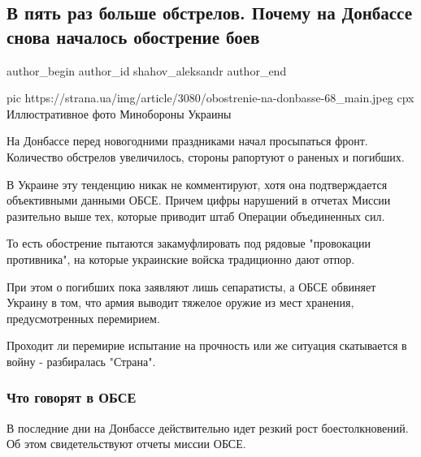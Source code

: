  
 
 
 
 
 
\subsection{В пять раз больше обстрелов. Почему на Донбассе снова началось обострение боев}
\label{sec:22_12_2020.news.ua.strana.shahov_aleksandr.1.donbass_obostrenie}
\ifcmt
	author_begin
   author_id shahov_aleksandr
	author_end
\fi

\ifcmt
pic https://strana.ua/img/article/3080/obostrenie-na-donbasse-68_main.jpeg
cpx Иллюстративное фото Минобороны Украины 
\fi

На Донбассе перед новогодними праздниками начал просыпаться фронт. Количество
обстрелов увеличилось, стороны рапортуют о раненых и погибших.

В Украине эту тенденцию никак не комментируют, хотя она подтверждается
объективными данными ОБСЕ. Причем цифры нарушений в отчетах Миссии разительно
выше тех, которые приводит штаб Операции объединенных сил.

То есть обострение пытаются закамуфлировать под рядовые "провокации
противника", на которые украинские войска традиционно дают отпор. 

При этом о погибших пока заявляют лишь сепаратисты, а ОБСЕ обвиняет Украину в
том, что армия выводит тяжелое оружие из мест хранения, предусмотренных
перемирием.

Проходит ли перемирие испытание на прочность или же ситуация скатывается в
войну - разбиралась "Страна". 

\subsubsection{Что говорят в ОБСЕ}

В последние дни на Донбассе действительно идет резкий рост боестолкновений. Об
этом свидетельствуют  отчеты миссии ОБСЕ. 

